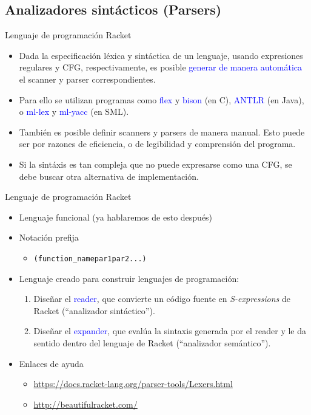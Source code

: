 \documentclass[handout]{beamer} %
\newcommand{\blue}[1]{\textcolor{blue}{#1}}
\begin{document}
\subsection{Analizadores sintácticos (Parsers)}

\begin{frame}{Lenguaje de programación Racket}
    \begin{itemize}
        \item<1-> Dada la especificación léxica y sintáctica de un lenguaje, usando expresiones regulares y CFG, respectivamente, es posible \blue{generar de manera automática} el scanner y parser correspondientes.
        \item<2-> Para ello se utilizan programas como \blue{flex} y \blue{bison} (en C), \blue{ANTLR} (en Java), o \blue{ml-lex} y \blue{ml-yacc} (en SML).
        \item<3-> También es posible definir scanners y parsers de manera manual. Esto puede ser por razones de eficiencia, o de legibilidad y comprensión del programa.
        \item<4-> Si la sintáxis es tan compleja que no puede expresarse como una CFG, se debe buscar otra alternativa de implementación.
    \end{itemize}
\end{frame}

\begin{frame}{Lenguaje de programación Racket}
    \begin{itemize}
        \item Lenguaje funcional (ya hablaremos de esto después)
        \item Notación prefija
        \begin{itemize}
            \item \begin{alltt}(function\_name par1 par2 ...)\end{alltt}
        \end{itemize}
        \item<2-> Lenguaje creado para construir lenguajes de programación:
        \begin{enumerate}
            \item Diseñar el \blue{reader}, que convierte un código fuente en \textit{S-expressions} de Racket (``analizador sintáctico'').
            \item Diseñar el \blue{expander}, que evalúa la sintaxis generada por el reader y le da sentido dentro del lenguaje de Racket (``analizador semántico'').
        \end{enumerate}
        \item<3-> Enlaces de ayuda
        \begin{itemize}
            \item \scriptsize{\url{https://docs.racket-lang.org/parser-tools/Lexers.html}}
            \item \scriptsize{\url{http://beautifulracket.com/}}
        \end{itemize}
    \end{itemize}
\end{frame}
\end{document}
